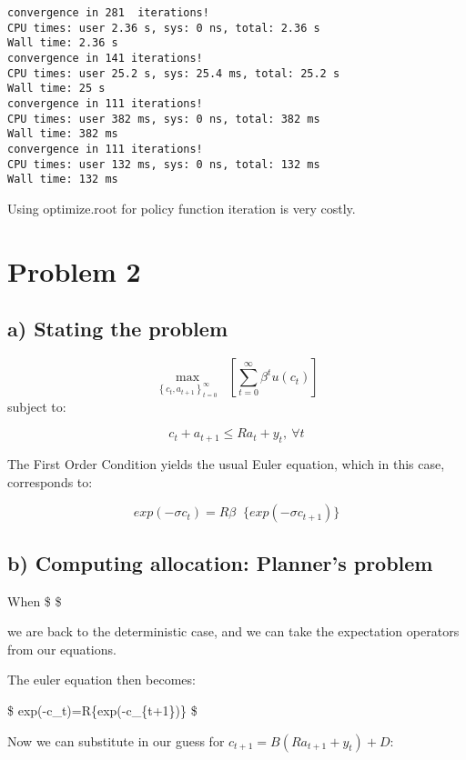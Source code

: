\documentclass[11pt]{article}
\begin{document}
    \begin{Verbatim}[commandchars=\\\{\}]
convergence in 281  iterations!
CPU times: user 2.36 s, sys: 0 ns, total: 2.36 s
Wall time: 2.36 s
convergence in 141 iterations!
CPU times: user 25.2 s, sys: 25.4 ms, total: 25.2 s
Wall time: 25 s
convergence in 111 iterations!
CPU times: user 382 ms, sys: 0 ns, total: 382 ms
Wall time: 382 ms
convergence in 111 iterations!
CPU times: user 132 ms, sys: 0 ns, total: 132 ms
Wall time: 132 ms
    \end{Verbatim}

    Using optimize.root for policy function iteration is very costly.

    \hypertarget{problem-2}{%
\section{Problem 2}\label{problem-2}}

    \hypertarget{a-stating-the-problem}{%
\subsection{a) Stating the problem}\label{a-stating-the-problem}}

\[
\max_{\left\{c_t, a_{t+1}\right\}_{t=0}^\infty} \mathop{E_0}  \left[\sum_{t=0}^{\infty} \beta^t u(c_t)\right]
\] subject to:

\[
c_t+a_{t+1}\leq Ra_t+y_t,\ \forall t
\]

The First Order Condition yields the usual Euler equation, which in this
case, corresponds to:

\[
exp(-\sigma c_t)=R\beta \mathop{E_t}\{exp(-\sigma c_{t+1})\}
\]

    \hypertarget{b-computing-allocation-planners-problem}{%
\subsection{b) Computing allocation: Planner's
problem}\label{b-computing-allocation-planners-problem}}

When \$  \$

we are back to the deterministic case, and we can take the expectation
operators from our equations.

The euler equation then becomes:

\$ exp(-\sigma c\_t)=R\beta \{exp(-\sigma c\_\{t+1\})\} \$

Now we can substitute in our guess for \(c_{t+1}=B(Ra_{t+1}+y_{t})+D\):
\end{document}
